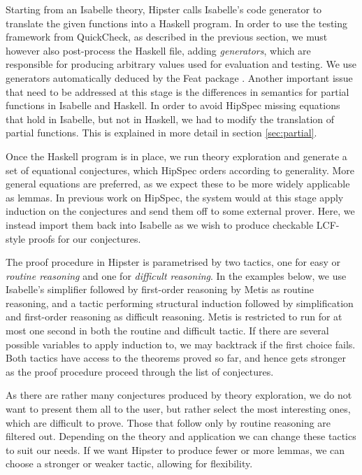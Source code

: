 Starting from an Isabelle theory, Hipster calls Isabelle's code generator \cite{codegen} to translate the given functions into a Haskell program. In order to use the testing framework from QuickCheck, as described in the previous section, we must however also post-process the Haskell file, adding \emph{generators}, which are responsible for producing arbitrary values used for evaluation and testing. We use generators automatically deduced by the Feat package \cite{feat}. Another important issue that need to be addressed at this stage is the differences in semantics for partial functions in Isabelle and Haskell. In order to avoid HipSpec missing equations that hold in Isabelle, but not in Haskell, we had to modify the translation of partial functions. This is explained in more detail in section \ref{sec:partial}.

Once the Haskell program is in place, we run theory exploration and generate a set of equational conjectures, which HipSpec orders according to generality. More general equations are preferred, as we expect these to be more widely applicable as lemmas. In previous work on HipSpec, the system would at this stage apply induction on the conjectures and send them off to some external prover. Here, we instead import them back into Isabelle as we wish to produce checkable LCF-style proofs for our conjectures. 

The proof procedure in Hipster is parametrised by two tactics, one for easy or \emph{routine reasoning} and one for \emph{difficult reasoning}. In the examples below, we use Isabelle's simplifier followed by first-order reasoning by Metis \cite{metis} as routine reasoning, and a tactic performing structural induction followed by simplification and first-order reasoning as difficult reasoning. Metis is restricted to run for at most one second in both the routine and difficult tactic. If there are several possible variables to apply induction to, we may backtrack if the first choice fails. Both tactics have access to the theorems proved so far, and hence gets stronger as the proof procedure proceed through the list of conjectures. 

As there are rather many conjectures produced by theory exploration, we do not want to present them all to the user, but rather select the most interesting ones, which are difficult to prove. Those that follow only by routine reasoning are filtered out. 
Depending on the theory and application we can change these tactics to suit our needs. If we want Hipster to produce fewer or more lemmas, we can choose a stronger or weaker tactic, allowing for flexibility.  

